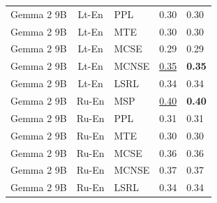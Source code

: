 \begin{table}
\begin{tabular}{lc}
Gemma 2 9B & Lt-En & PPL & 0.30 & 0.30 \\
Gemma 2 9B & Lt-En & MTE & 0.30 & 0.30 \\
Gemma 2 9B & Lt-En & MCSE & 0.29 & 0.29 \\
Gemma 2 9B & Lt-En & MCNSE & \underline{0.35} & \textbf{0.35} \\
Gemma 2 9B & Lt-En & LSRL & 0.34 & 0.34 \\
Gemma 2 9B & Ru-En & MSP & \underline{0.40} & \textbf{0.40} \\
Gemma 2 9B & Ru-En & PPL & 0.31 & 0.31 \\
Gemma 2 9B & Ru-En & MTE & 0.30 & 0.30 \\
Gemma 2 9B & Ru-En & MCSE & 0.36 & 0.36 \\
Gemma 2 9B & Ru-En & MCNSE & 0.37 & 0.37 \\
Gemma 2 9B & Ru-En & LSRL & 0.34 & 0.34 \\
\midrule
\end{tabular}
\end{table}
